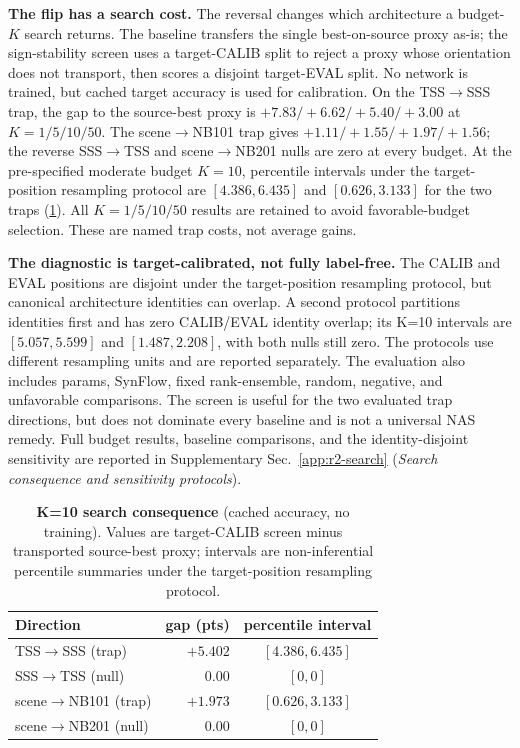 \noindent\textbf{The flip has a search cost.}\label{sec:searchtransfer}\label{find:searchtransfer}{}
The reversal changes which architecture a budget-$K$ search returns. The baseline
transfers the single best-on-source proxy as-is; the sign-stability screen uses a
target-CALIB split to reject a proxy whose orientation does not transport, then
scores a disjoint target-EVAL split. No network is trained, but cached target
accuracy is used for calibration. On the TSS${\to}$SSS trap, the gap to
the source-best proxy is $+7.83/+6.62/+5.40/+3.00$ at $K{=}1/5/10/50$.
The scene${\to}$NB101 trap gives $+1.11/+1.55/+1.97/+1.56$; the reverse
SSS${\to}$TSS and scene${\to}$NB201 nulls are zero at every budget. At the
pre-specified moderate budget $K{=}10$, percentile intervals under the
target-position resampling protocol are
$[4.386,6.435]$ and $[0.626,3.133]$ for the two traps
(\cref{tab:searchtransfer}). All $K{=}1/5/10/50$ results are retained to avoid
favorable-budget selection. These are named trap costs, not average gains.

\noindent\textbf{The diagnostic is target-calibrated, not fully label-free.}{}
The CALIB and EVAL positions are disjoint under the target-position
resampling protocol, but
canonical architecture identities can overlap. A second protocol partitions
identities first and has zero CALIB/EVAL identity overlap; its K=10 intervals are
$[5.057,5.599]$ and $[1.487,2.208]$, with both nulls still zero. The protocols
use different resampling units and are reported separately. The evaluation
also includes params, SynFlow, fixed rank-ensemble, random, negative, and
unfavorable comparisons. The screen is useful for the two evaluated trap
directions, but
does not dominate every baseline and is not a universal NAS remedy.
Full budget results, baseline comparisons, and the identity-disjoint sensitivity
are reported in Supplementary Sec.~\ref{app:r2-search}
(\emph{Search consequence and sensitivity protocols}).

\begin{table}[htbp]
  \centering
  \small
  \caption{\textbf{K=10 search consequence} (cached accuracy, no training).
  Values are target-CALIB screen minus transported source-best proxy; intervals
  are non-inferential percentile summaries under the target-position
  resampling protocol.}
  \label{tab:searchtransfer}
  \begin{tabular}{@{}lrc@{}}
    \toprule
    Direction & gap (pts) & percentile interval \\
    \midrule
    TSS${\to}$SSS (trap) & $+5.402$ & $[4.386,6.435]$ \\
    SSS${\to}$TSS (null) & $0.00$ & $[0,0]$ \\
    scene${\to}$NB101 (trap) & $+1.973$ & $[0.626,3.133]$ \\
    scene${\to}$NB201 (null) & $0.00$ & $[0,0]$ \\
    \bottomrule
  \end{tabular}
\end{table}

